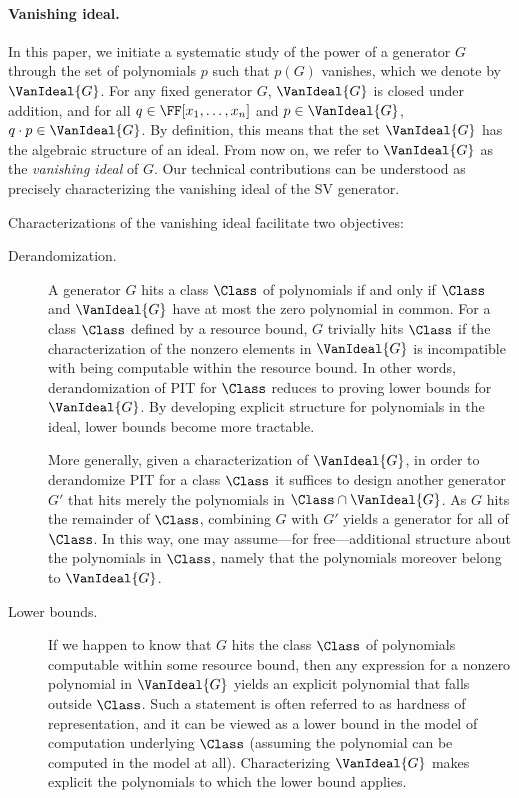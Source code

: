 \paragraph{Vanishing ideal.}
In this paper, we initiate a systematic study of the power of a generator $G$ through the set of polynomials $p$ such that $p(G)$ vanishes, which we denote by \(\VanIdeal{G}\). For any fixed generator $G$, \(\VanIdeal{G}\) is closed under addition, and for all \(q\in \FF[x_1,\dots,x_n]\) and \(p\in \VanIdeal{G}\), \(q\cdot p\in \VanIdeal{G}\). By definition, this means that the set \(\VanIdeal{G}\) has the algebraic structure of an ideal. From now on, we refer to \(\VanIdeal{G}\) as the \emph{vanishing ideal} of $G$. Our technical contributions can be understood as precisely characterizing the vanishing ideal of the SV generator.

Characterizations of the vanishing ideal facilitate two objectives:
\begin{description}

  \item[Derandomization.]
   A generator $G$ hits a class $\Class$ of polynomials if and only if $\Class$ and $\VanIdeal{G}$ have at most the zero polynomial in common. For a class $\Class$ defined by a resource bound, $G$ trivially hits $\Class$ if the characterization of the nonzero elements in $\VanIdeal{G}$ is incompatible with being computable within the resource bound. In other words, derandomization of PIT for $\Class$ reduces to proving lower bounds for $\VanIdeal{G}$. By developing explicit structure for polynomials in the ideal, lower bounds become more tractable. 

   More generally, given a characterization of $\VanIdeal{G}$, in order to derandomize PIT for a class \(\Class\) it suffices to design another generator $G'$ that hits merely the polynomials in $\Class \cap \VanIdeal{G}$. As $G$ hits the remainder of $\Class$, combining $G$ with $G'$ yields a generator for all of $\Class$. In this way, one may assume---for free---additional structure about the polynomials in $\Class$, namely that the polynomials moreover belong to $\VanIdeal{G}$. 

  \item[Lower bounds.]
    If we happen to know that $G$ hits the class $\Class$ of polynomials
    computable within some resource bound,
    then any expression for a nonzero polynomial in $\VanIdeal{G}$ yields an
    explicit polynomial that falls outside $\Class$.
    Such a statement is often referred to as hardness of representation,
    and it can be viewed as a lower bound in the model of computation underlying
    $\Class$ (assuming the polynomial can be computed in the model at all).
    Characterizing \(\VanIdeal{G}\) makes explicit the polynomials to which
    the lower bound applies.

\end{description}

